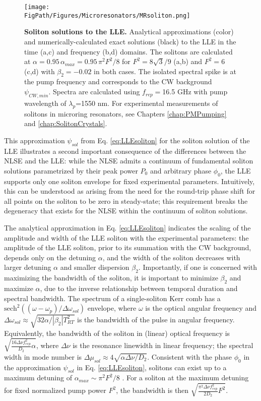 \begin{figure}[htpb]
	\begin{center}
		\texttt{[image: \\FigPath/Figures/Microresonators/MRsoliton.png]}
	\end{center}
	\caption[Soliton solutions to the LLE]{\textbf{Soliton solutions to the LLE.} Analytical approximations (color) and numerically-calculated exact solutions (black) to the LLE in the time (a,c) and frequency (b,d) domains. The solitons are calculated at $\alpha=0.95\,\alpha_{max}=0.95\,\pi^2F^2/8$ for $F^2=8\sqrt{3}/9$ (a,b) and $F^2=6$ (c,d) with $\beta_2=-0.02$ in both cases. The isolated spectral spike is at the pump frequency and corresponds to the CW background $\psi_{CW,min}$. Spectra are calculated using $f_{rep}=$16.5 GHz with pump wavelength of $\lambda_p$=1550 nm. For experimental measurements of solitons in microring resonators, see Chapters \ref{chap:PMPumping} and \ref{chap:SolitonCrystals}.
	}
	
	\label{fig:MRsoliton}
\end{figure} 


This approximation $\psi_{sol}$ from Eq. \ref{eq:LLEsoliton} for the soliton solution of the LLE illustrates a second important consequence of the differences between the NLSE and the LLE: while the NLSE admits a continuum of fundamental soliton solutions parametrized by their peak power $P_0$ and arbitrary phase $\phi_0$, the LLE supports only one soliton envelope for fixed experimental parameters.  Intuitively, this can be understood as arising from the need for the round-trip phase shift for all points on the soliton to be zero in steady-state; this requirement breaks the degeneracy that exists for the NLSE within the continuum of soliton solutions.

The analytical approximation in Eq. \ref{eq:LLEsoliton} indicates the scaling of the amplitude and width of the LLE soliton with the experimental parameters: the amplitude of the LLE soliton, prior to its summation with the CW background, depends only on the detuning $\alpha$, and the width of the soliton decreases with larger detuning $\alpha$ and smaller dispersion $\beta_2$. Importantly, if one is concerned with maximizing the bandwidth of the soliton, it is important to minimize $\beta_2$ and maximize $\alpha$, due to the inverse relationship between temporal duration and spectral bandwidth. The spectrum of a single-soliton Kerr comb has a $\mathrm{sech}^2\left((\omega-\omega_p)/\Delta \omega_{sol}\right)$ envelope, where $\omega$ is the optical angular frequency and $\Delta\omega_{sol}\approx\sqrt{32\alpha/|\beta_2| T_{RT}^2 }$ is the bandwidth of the pulse in angular frequency. Equivalently, the bandwidth of the soliton in (linear) optical frequency is $\sqrt{\frac{16\Delta\nu f_{rep}^2}{D_2}\alpha}$, where $\Delta\nu$ is the resonance linewidth in linear frequency; the spectral width in mode number is $\Delta\mu_{sol}\approx4\sqrt{\alpha\Delta\nu/D_2}$. Consistent with the phase $\phi_0$ in the approximation $\psi_{sol}$ in Eq. \ref{eq:LLEsoliton}, solitons can exist up to a maximum detuning of $\alpha_{max}\sim\pi^2 F^2/8$ \cite{Herr2014}. For a soliton at the maximum detuning for fixed normalized pump power $F^2$, the bandwidth is then $\sqrt{\frac{\pi^2\Delta\nu f_{rep}^2}{2 D_2}F^2}$. 

